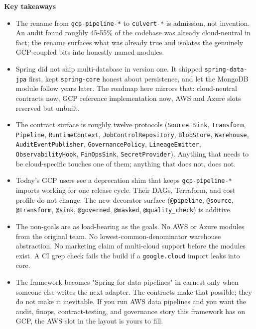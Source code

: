 \documentclass[
  11pt,
  british,
  oneside]{book}
\begin{document}
\begin{takeaways}
\textbf{Key takeaways}
\begin{itemize}
  \item The rename from \texttt{gcp-pipeline-*} to \texttt{culvert-*} is admission, not invention. An audit found roughly 45-55\% of the codebase was already cloud-neutral in fact; the rename surfaces what was already true and isolates the genuinely GCP-coupled bits into honestly named modules.
  \item Spring did not ship multi-database in version one. It shipped \texttt{spring-data-jpa} first, kept \texttt{spring-core} honest about persistence, and let the MongoDB module follow years later. The roadmap here mirrors that: cloud-neutral contracts now, GCP reference implementation now, AWS and Azure slots reserved but unbuilt.
  \item The contract surface is roughly twelve protocols (\texttt{Source}, \texttt{Sink}, \texttt{Transform}, \texttt{Pipeline}, \texttt{RuntimeContext}, \texttt{JobControlRepository}, \texttt{BlobStore}, \texttt{Warehouse}, \texttt{AuditEventPublisher}, \texttt{GovernancePolicy}, \texttt{LineageEmitter}, \texttt{ObservabilityHook}, \texttt{FinOpsSink}, \texttt{SecretProvider}). Anything that needs to be cloud-specific touches one of them; anything that does not, does not.
  \item Today's GCP users see a deprecation shim that keeps \texttt{gcp-pipeline-*} imports working for one release cycle. Their DAGs, Terraform, and cost profile do not change. The new decorator surface (\texttt{@pipeline}, \texttt{@source}, \texttt{@transform}, \texttt{@sink}, \texttt{@governed}, \texttt{@masked}, \texttt{@quality\_check}) is additive.
  \item The non-goals are as load-bearing as the goals. No AWS or Azure modules from the original team. No lowest-common-denominator warehouse abstraction. No marketing claim of multi-cloud support before the modules exist. A CI grep check fails the build if a \texttt{google.cloud} import leaks into core.
  \item The framework becomes "Spring for data pipelines" in earnest only when someone else writes the next adapter. The contracts make that possible; they do not make it inevitable. If you run AWS data pipelines and you want the audit, finops, contract-testing, and governance story this framework has on GCP, the AWS slot in the layout is yours to fill.
\end{itemize}
\end{takeaways}
\end{document}
